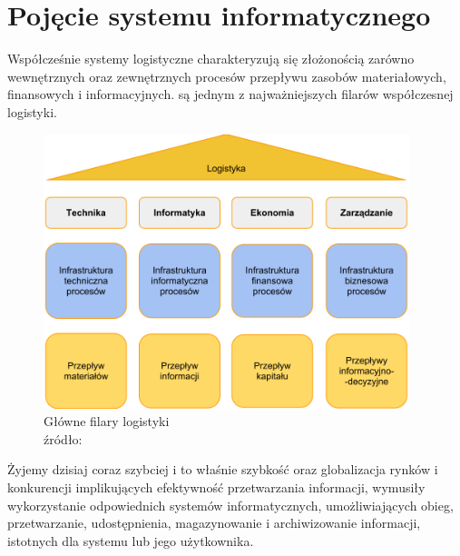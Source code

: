 \section{Pojęcie systemu informatycznego}	
	Współcześnie systemy logistyczne charakteryzują się złożonością zarówno wewnętrznych oraz zewnętrznych
	procesów przepływu zasobów materiałowych, finansowych i informacyjnych. są jednym z najważniejszych filarów
	współczesnej logistyki.
	\begin{figure}[H]
		\centering
		\includegraphics[width=0.95\textwidth]{images/filary_logistyki}
		\caption[Główne filary logistyki]{
			Główne filary logistyki\\
			źródło: \cite{logistyka_w_przedsiebiorstwie}
		}
	\end{figure}
	Żyjemy dzisiaj coraz szybciej i to właśnie szybkość oraz globalizacja rynków i konkurencji
	implikujących efektywność przetwarzania informacji, wymusiły wykorzystanie odpowiednich
	systemów informatycznych, umożliwiających obieg, przetwarzanie, udostępnienia, magazynowanie
	i archiwizowanie informacji, istotnych dla systemu lub jego użytkownika.  	
	

